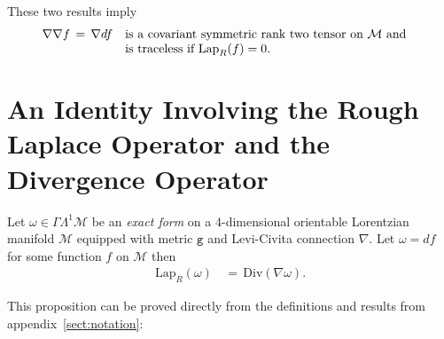 \documentclass[10pt,a4paper]{article}
\newcommand{\M}{\mathcal{M}}
\newcommand{\g}{\texttt{g}}
\newcommand{\LapR}{\text{Lap}_{R}}
\newcommand{\Div}{\text{Div}}
\newenvironment{prop*}[1]{
	\def\FrameCommand
    {%
        {\color{black}\vrule width 0.3em}%
        \hspace{0.em}%
		\fboxsep=\FrameSep\colorbox{white!95!black}%
    }%
    \MakeFramed{\hsize\hsize\advance\hsize-\width\FrameRestore}%
	\ifstrempty{#1}{%
					{\bf Proposition} \\[0.2cm] }{%
					{\bf Proposition} \; (#1) \\[0.2cm] }
	}
{%
    \endMakeFramed
}
\begin{document}
These two results imply
\begin{align}\label{nabdfSYM}
	\nabla\nabla f &\,=\, \nabla df \quad \parbox[t]{8cm}{is a covariant symmetric rank two tensor on $\M$ and is traceless if $\LapR(f)=0$.}
\end{align}


\section{An Identity Involving the Rough Laplace Operator and the Divergence Operator}
\begin{prop*}{}
	Let $\omega \in \Gamma\Lambda^{1}\M$ be an {\it exact form} on a $4$-dimensional orientable Lorentzian manifold $\M$ equipped with metric $\g$ and Levi-Civita connection $\nabla$. Let $\omega=df$ for some function $f$ on $\M$ then
	\begin{align}\label{LapRDivIDENT}
		\LapR(\omega) &\,=\, \Div(\nabla\omega).
	\end{align}
\end{prop*}

This proposition can be proved directly from the definitions and results from appendix~\ref{sect:notation}:\\
\end{document}

